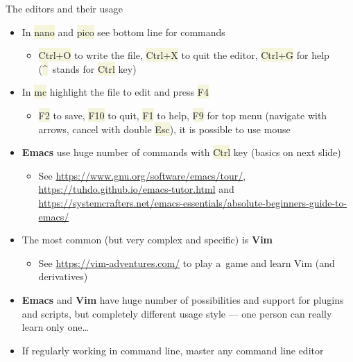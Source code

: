 \documentclass[compress, xelatex, 11pt, xcolor=svgnames, aspectratio=169,
	hyperref={
		bookmarks=true,
		unicode=true,
		colorlinks=true,
		pdftitle={Linux, command line and MetaCentrum},
		plainpages=false,
		pdfauthor={Vojtech Zeisek},
		pdfsubject={Course about use of Linux command line, writing shell scripts and using MetaCentrum of CESNET},
		pdfcreator={XeLaTeX},
		pdfkeywords={Linux, GNU, BASH, shell, command line, MetaCentrum},
		linkcolor=DarkRed, %
		anchorcolor=DarkBlue, %
		citecolor=Indigo, %
		filecolor=NavyBlue, %
		menucolor=DarkMagenta, %
		urlcolor=DarkBlue, %
		},
	url={hyphens, lowtilde} %
	]{beamer}
\renewcommand{\texttt}[1]{\colorbox{Beige}{{\ttfamily #1}}}
\begin{document}
\begin{frame}{The editors and their usage}
	\begin{itemize}
		\item In \texttt{nano} and \texttt{pico} see bottom line for commands
		\begin{itemize}
			\item \texttt{Ctrl+O} to write the file, \texttt{Ctrl+X} to quit the editor, \texttt{Ctrl+G} for help (\texttt{\textasciicircum}~stands for \texttt{Ctrl} key)
		\end{itemize}
		\item In \texttt{mc} highlight the file to edit and press \texttt{F4}
		\begin{itemize}
			\item \texttt{F2} to save, \texttt{F10} to quit, \texttt{F1} to help, \texttt{F9} for top menu (navigate with arrows, cancel with double \texttt{Esc}), it is possible to use mouse
		\end{itemize}
		\item \textbf{Emacs} use huge number of commands with \texttt{Ctrl} key (basics on next slide)
		\begin{itemize}
			\item See \url{https://www.gnu.org/software/emacs/tour/}, \url{https://tuhdo.github.io/emacs-tutor.html} and \url{https://systemcrafters.net/emacs-essentials/absolute-beginners-guide-to-emacs/}
		\end{itemize}
		\item The most common (but very complex and specific) is \textbf{Vim}
		\begin{itemize}
			\item See \url{https://vim-adventures.com/} to play a~game and learn Vim (and derivatives)
		\end{itemize}
		\item \textbf{Emacs} and \textbf{Vim} have huge number of possibilities and support for plugins and scripts, but completely different usage style --- one person can really learn only one\ldots
		\item If regularly working in command line, master any command line editor
	\end{itemize}
\end{frame}
\end{document}
